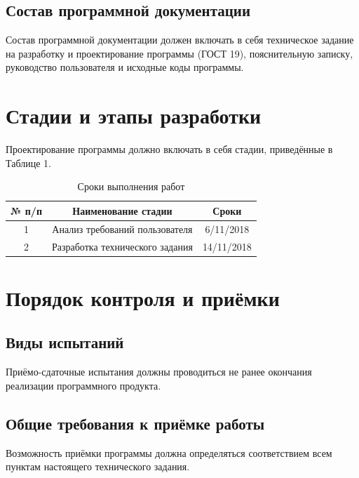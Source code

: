 \documentclass[14pt]{extarticle}
\begin{document}
    \subsection{Состав программной документации}
    Состав программной документации должен включать в себя техническое задание на разработку и проектирование программы (ГОСТ 19), пояснительную записку, руководство пользователя и исходные коды программы.
    
\section{Стадии и этапы разработки}
Проектирование программы должно включать в себя стадии, приведённые в Таблице 1.\\
\begin{table}[h!]
\caption{Сроки выполнения работ}
    \begin{center}
    
    \label{tab:table1}
      \begin{tabular}{|c|c|c|}
      \hline
№ п/п & Наименование стадии             & Сроки         \\
\hline
1     & Анализ требований пользователя  & 6/11/2018     \\
\hline
2     & Разработка технического задания & 14/11/2018     \\
\hline
        \end{tabular}
        \end{center}
\end{table}

\section{Порядок контроля и приёмки}
    \subsection{Виды испытаний}
    Приёмо-сдаточные испытания должны проводиться не ранее окончания реализации программного продукта.
    \subsection{Общие требования к приёмке работы}
    Возможность приёмки программы должна определяться соответствием всем пунктам настоящего технического задания.

\newpage

 \\
 \\
\end{document}
